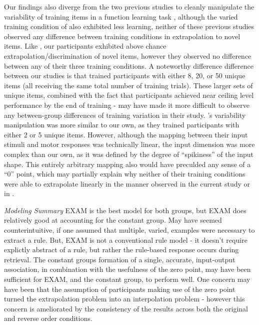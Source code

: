 \documentclass[
  12pt,
  letterpaper,
]{article}
\begin{document}
Our findings also diverge from the two previous studies to cleanly
manipulate the variability of training items in a function learning task
\autocite{deloshExtrapolationSineQua1997,vandamMappingShapeVisuomotor2015},
although the varied training condition of
\textcite{vandamMappingShapeVisuomotor2015} also exhibited less
learning, neither of these previous studies observed any difference
between training conditions in extrapolation to novel items. Like
\textcite{deloshExtrapolationSineQua1997} , our participants exhibited
above chance extrapolation/discrimination of novel items, however they
observed no difference between any of their three training conditions. A
noteworthy difference difference between our studies is that
\textcite{deloshExtrapolationSineQua1997} trained participants with
either 8, 20, or 50 unique items (all receiving the same total number of
training trials). These larger sets of unique items, combined with the
fact that participants achieved near ceiling level performance by the
end of training - may have made it more difficult to observe any
between-group differences of training variation in their study.
\textcite{vandamMappingShapeVisuomotor2015} 's variability manipulation
was more similar to our own, as they trained participants with either 2
or 5 unique items. However, although the mapping between their input
stimuli and motor responses was technically linear, the input dimension
was more complex than our own, as it was defined by the degree of
``spikiness'' of the input shape. This entirely arbitrary mapping also
would have preculded any sense of a ``0'' point, which may partially
explain why neither of their training conditions were able to
extrapolate linearly in the manner observed in the current study or in
\textcite{deloshExtrapolationSineQua1997}.

\emph{Modeling Summary} EXAM is the best model for both groups, but EXAM
does relatively good at accounting for the constant group. May have
seemed counterintuitive, if one assumed that multiple, varied, examples
were necessary to extract a rule. But, EXAM is not a conventional rule
model - it doesn't require explictly abstract of a rule, but rather the
rule-based response occurs during retrieval. The constant groups
formation of a single, accurate, input-output association, in
combination with the usefulness of the zero point, may have been
sufficient for EXAM, and the constant group, to perform well. One
concern may have been that the assumption of participants making use of
the zero point turned the extrapolation problem into an interpolation
problem - however this concern is ameliorated by the consistency of the
results across both the original and reverse order conditions.
\end{document}
